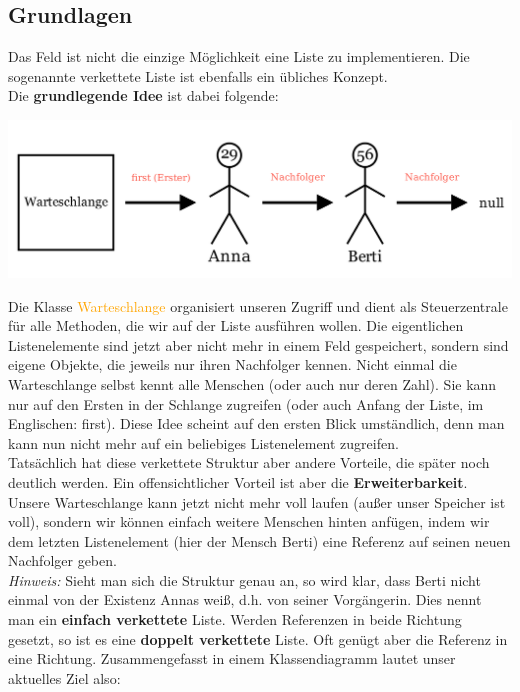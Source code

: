 \documentclass{article}
\begin{document}
\subsection{Grundlagen}
Das Feld ist nicht die einzige Möglichkeit eine Liste zu implementieren. Die sogenannte 
verkettete Liste ist ebenfalls ein übliches Konzept. \\
Die \textbf{\color{red}grundlegende Idee} ist dabei folgende:
\begin{center}
    \includegraphics[scale=0.25]{../media/linked_idea.png}
\end{center}
Die Klasse \textcolor{orange}{Warteschlange} organisiert unseren Zugriff und dient als Steuerzentrale für alle Methoden, die 
wir auf der Liste ausführen wollen. Die eigentlichen Listenelemente sind jetzt aber nicht mehr in einem 
Feld gespeichert, sondern sind eigene Objekte, die jeweils nur ihren Nachfolger kennen. Nicht einmal die 
Warteschlange selbst kennt alle Menschen (oder auch nur deren Zahl). Sie kann nur auf den Ersten in der Schlange
zugreifen (oder auch Anfang der Liste, im Englischen: first). Diese Idee scheint auf den ersten 
Blick umständlich, denn man kann nun nicht mehr auf ein beliebiges Listenelement zugreifen. \\
Tatsächlich hat diese verkettete Struktur aber andere Vorteile, die später noch deutlich werden. Ein 
offensichtlicher Vorteil ist aber die \textbf{Erweiterbarkeit}. Unsere Warteschlange kann jetzt nicht mehr 
voll laufen (außer unser Speicher ist voll), sondern wir können einfach weitere Menschen hinten anfügen, indem
wir dem letzten Listenelement (hier der Mensch Berti) eine Referenz auf seinen neuen Nachfolger geben. \\
\textit{Hinweis:} Sieht man sich die Struktur genau an, so wird klar, dass Berti nicht einmal von der 
Existenz Annas weiß, d.h. von seiner Vorgängerin. Dies nennt man ein \textbf{einfach verkettete} Liste.
Werden Referenzen in beide Richtung gesetzt, so ist es eine \textbf{doppelt verkettete} Liste. Oft 
genügt aber die Referenz in eine Richtung. 
Zusammengefasst in einem Klassendiagramm lautet unser aktuelles Ziel also: 
\end{document}
